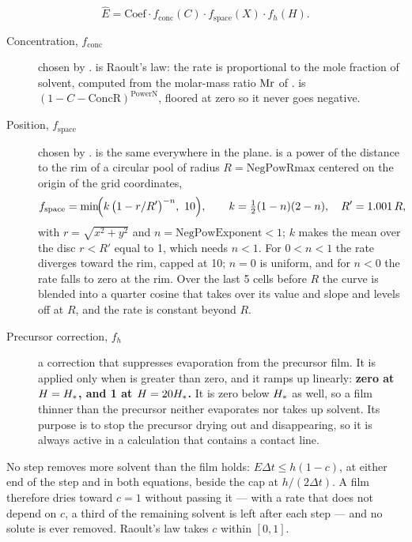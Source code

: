 \begin{equation}\label{eq:evap-factor}
  \hat{E} = \mathrm{Coef}\cdot f_{\mathrm{conc}}(C)\cdot
            f_{\mathrm{space}}(X)\cdot f_h(H).
\end{equation}

\begin{description}
  \item[Concentration, $f_{\mathrm{conc}}$] chosen by .
     is Raoult's law: the rate is proportional to the mole
    fraction of solvent, computed from the molar-mass ratio $\mathrm{Mr}$ of
    .  is
    $(1 - C - \mathrm{ConcR})^{\mathrm{PowerN}}$, floored at zero so it never
    goes negative.
  \item[Position, $f_{\mathrm{space}}$] chosen by .
     is the same everywhere in the plane.  is a
    power of the distance to the rim of a circular pool of radius
    $R = \mathrm{NegPowRmax}$ centered on the origin of the grid coordinates,
    \begin{equation}\label{eq:evap-negpow}
      f_{\mathrm{space}} = \min\!\Bigl(k\,\bigl(1 - r/R'\bigr)^{-n},\ 10\Bigr),
      \qquad k = \tfrac{1}{2}(1-n)(2-n),\quad R' = 1.001\,R,
    \end{equation}
    with $r = \sqrt{x^2+y^2}$ and $n = \mathrm{NegPowExponent} < 1$; $k$
    makes the mean over the disc $r < R'$ equal to 1, which needs $n < 1$.
    For $0 < n < 1$ the rate diverges toward the rim, capped at 10; $n = 0$
    is uniform, and for $n < 0$ the rate falls to zero at the rim. Over the last 5 cells before $R$ the curve is blended
    into a quarter cosine that takes over its value and slope and levels off
    at $R$, and the rate is constant beyond $R$.
  \item[Precursor correction, $f_h$] a correction that suppresses evaporation
    from the precursor film. It is applied only when  is
    greater than zero, and it ramps up linearly: \textbf{zero at $H = H_{*}$,
    and 1 at $H = 20H_{*}$.} It is zero below $H_{*}$ as well, so a film
    thinner than the precursor neither evaporates nor takes up solvent. Its purpose is to stop the precursor drying out
    and disappearing, so it is always active in a calculation that contains a
    contact line.
\end{description}

No step removes more solvent than the film holds: $E\Delta t \le h(1-c)$, at
either end of the step and in both equations, beside the cap at
$h/(2\Delta t)$. A film therefore dries toward $c = 1$ without passing it ---
with a rate that does not depend on $c$, a third of the remaining solvent is
left after each step --- and no solute is ever removed. Raoult's law takes $c$
within $[0, 1]$.

